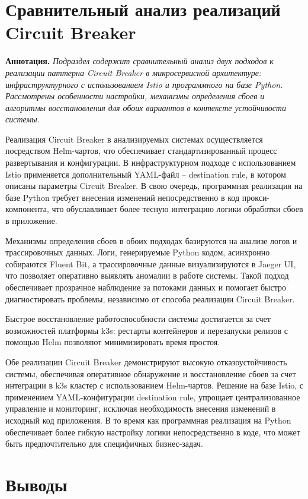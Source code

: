 \section{Сравнительный анализ реализаций Circuit Breaker}
  
\textbf{Аннотация.} \textit{Подраздел содержит сравнительный анализ двух подходов к реализации паттерна Circuit Breaker в микросервисной архитектуре: инфраструктурного с использованием Istio и программного на базе Python. Рассмотрены особенности настройки, механизмы определения сбоев и алгоритмы восстановления для обоих вариантов в контексте устойчивости системы.}

Реализация Circuit Breaker в анализируемых системах осуществляется посредством Helm-чартов, что обеспечивает стандартизированный процесс развертывания и конфигурации. В инфраструктурном подходе с использованием Istio применяется дополнительный YAML-файл – destination rule, в котором описаны параметры Circuit Breaker. В свою очередь, программная реализация на базе Python требует внесения изменений непосредственно в код прокси-компонента, что обуславливает более тесную интеграцию логики обработки сбоев в приложение.

Механизмы определения сбоев в обоих подходах базируются на анализе логов и трассировочных данных. Логи, генерируемые Python кодом, асинхронно собираются Fluent Bit, а трассировочные данные визуализируются в Jaeger UI, что позволяет оперативно выявлять аномалии в работе системы. Такой подход обеспечивает прозрачное наблюдение за потоками данных и помогает быстро диагностировать проблемы, независимо от способа реализации Circuit Breaker.

Быстрое восстановление работоспособности системы достигается за счет возможностей платформы k3s: рестарты контейнеров и перезапуски релизов с помощью Helm позволяют минимизировать время простоя. 

Обе реализации Circuit Breaker демонстрируют высокую отказоустойчивость системы, обеспечивая оперативное обнаружение и восстановление сбоев за счет интеграции в k3s кластер с использованием Helm-чартов. Решение на базе Istio, с применением YAML-конфигурации destination rule, упрощает централизованное управление и мониторинг, исключая необходимость внесения изменений в исходный код приложения. В то время как программная реализация на Python обеспечивает более гибкую настройку логики непосредственно в коде, что может быть предпочтительно для специфичных бизнес-задач.  

\section{Выводы}
  
